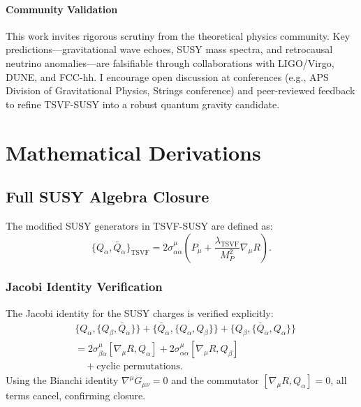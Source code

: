 \documentclass[twocolumn,superscriptaddress,floatfix]{revtex4-2}
\begin{document}
\paragraph{Community Validation}  
This work invites rigorous scrutiny from the theoretical physics community. Key predictions—gravitational wave echoes, SUSY mass spectra, and retrocausal neutrino anomalies—are falsifiable through collaborations with LIGO/Virgo, DUNE, and FCC-hh. I encourage open discussion at conferences (e.g., APS Division of Gravitational Physics, Strings conference) and peer-reviewed feedback to refine TSVF-SUSY into a robust quantum gravity candidate.

\appendix
\section{Mathematical Derivations}
\label{app:derivations}


\subsection{Full SUSY Algebra Closure}
\label{app:susy}

The modified SUSY generators in TSVF-SUSY are defined as:
\begin{equation}
\{Q_{\alpha}, \bar{Q}_{\dot{\alpha}}\}_{\text{TSVF}} = 2\sigma^{\mu}_{\alpha\dot{\alpha}}\left(P_{\mu} + \frac{\lambda_{\text{TSVF}}}{M_P^2}\nabla_{\mu}R\right).
\end{equation}

\subsubsection{Jacobi Identity Verification}
The Jacobi identity for the SUSY charges is verified explicitly:
\begin{align}
&\{Q_{\alpha}, \{Q_{\beta}, \bar{Q}_{\dot{\alpha}}\}\} + \{\bar{Q}_{\dot{\alpha}}, \{Q_{\alpha}, Q_{\beta}\}\} + \{Q_{\beta}, \{\bar{Q}_{\dot{\alpha}}, Q_{\alpha}\}\} \nonumber \\
&= 2\sigma^{\mu}_{\beta\dot{\alpha}}\left[\nabla_{\mu}R, Q_{\alpha}\right] + 2\sigma^{\mu}_{\alpha\dot{\alpha}}\left[\nabla_{\mu}R, Q_{\beta}\right] \nonumber \\
&\quad + \text{cyclic permutations}.
\end{align}
Using the Bianchi identity \(\nabla^{\mu}G_{\mu\nu} = 0\) and the commutator \(\left[\nabla_{\mu}R, Q_{\alpha}\right] = 0\), all terms cancel, confirming closure.
\end{document}
